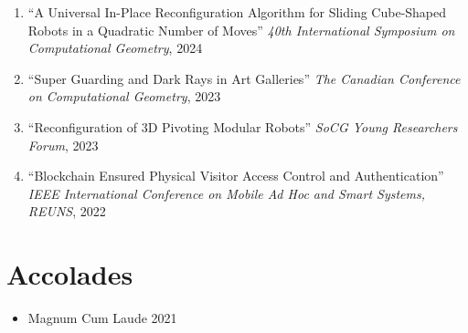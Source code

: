 \documentclass[letterpaper,11pt]{article}
\makeatletter
\newcommand{\resumeSubHeadingListStart}{\begin{itemize}[leftmargin=*]}
\newcommand{\resumeSubHeadingListEnd}{\end{itemize}}
\newcommand{\resumeSubheading}[4]{%
  \item[]%
  \begin{tabularx}{\textwidth}{>{\raggedright\arraybackslash}X@{\hspace{0.5em}}r}
    {\bfseries{\textsc{#1}}} & #2 \\[2pt]
    {\small #3}               & {\small #4} \\
  \end{tabularx}%
}
\newcommand{\presentation}[3]{
  \item ``#1'' %
     \emph{#2}, %
      #3%


}
\newcommand{\resumeOneLine}[2]{%
  \item[] #1 #2
}
\newcommand{\pdficon}{\faFilePdf}
\makeatother
\begin{document}
\begin{enumerate}
  \presentation{A Universal In-Place Reconfiguration Algorithm for Sliding Cube-Shaped Robots in a Quadratic Number of Moves}{40th International Symposium on Computational Geometry}{2024} \vspace{-.5em}  
  \presentation{Super Guarding and Dark Rays in Art Galleries}{The Canadian Conference on Computational Geometry}{2023} \vspace{-.5em}  
  \presentation{Reconfiguration of 3D Pivoting Modular Robots}{SoCG Young Researchers Forum}{2023} \vspace{-.5em}  
  \presentation{Blockchain Ensured Physical Visitor Access Control and Authentication}{IEEE International Conference on Mobile Ad Hoc and Smart Systems, REUNS}{2022} 
\end{enumerate}

\section{Accolades}
\resumeSubHeadingListStart
  \resumeOneLine{Magnum Cum Laude}{2021}
\resumeSubHeadingListEnd
\end{document}
